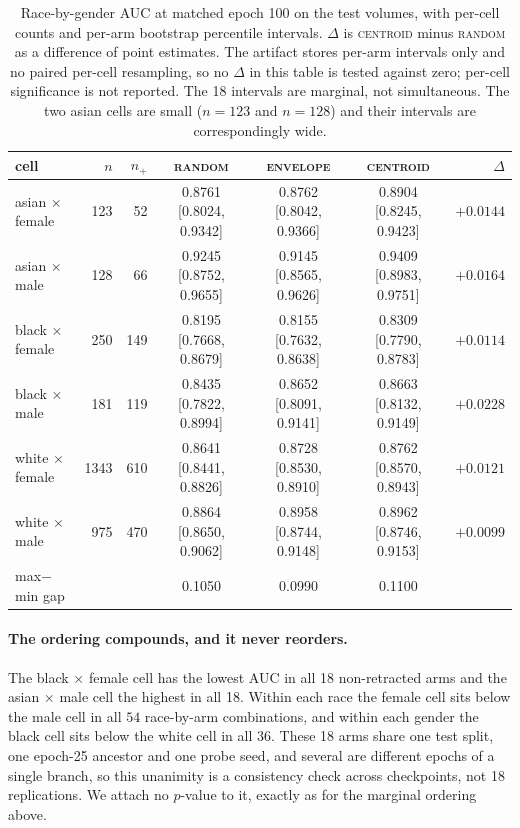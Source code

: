 \documentclass{article}
\newcommand{\ArmBest}{\textsc{centroid}}
\begin{document}
\begin{table}[h]
\centering
\caption{Race-by-gender AUC at matched epoch 100 on the \Ntest{} test volumes, with
per-cell counts and per-arm bootstrap percentile intervals. $\Delta$ is
\ArmBest{} minus \textsc{random} as a difference of point estimates. The
artifact stores per-arm intervals only and no paired per-cell resampling, so no
$\Delta$ in this table is tested against zero; per-cell significance is not reported.
The 18 intervals are marginal, not simultaneous.
The two asian cells are small ($n{=}123$ and $n{=}128$) and their intervals are
correspondingly wide.}
\label{tab:intersectional}
\scriptsize
\setlength{\tabcolsep}{3.5pt}
\begin{tabular}{lrrcccr}
\toprule
cell & $n$ & $n_{+}$ & \textsc{random} & \textsc{envelope} & \ArmBest{} & $\Delta$ \\
\midrule
asian $\times$ female & 123  & 52  & 0.8761 [0.8024, 0.9342] & 0.8762 [0.8042, 0.9366] & 0.8904 [0.8245, 0.9423] & $+0.0144$ \\
asian $\times$ male   & 128  & 66  & 0.9245 [0.8752, 0.9655] & 0.9145 [0.8565, 0.9626] & 0.9409 [0.8983, 0.9751] & $+0.0164$ \\
black $\times$ female & 250  & 149 & 0.8195 [0.7668, 0.8679] & 0.8155 [0.7632, 0.8638] & 0.8309 [0.7790, 0.8783] & $+0.0114$ \\
black $\times$ male   & 181  & 119 & 0.8435 [0.7822, 0.8994] & 0.8652 [0.8091, 0.9141] & 0.8663 [0.8132, 0.9149] & $+0.0228$ \\
white $\times$ female & 1343 & 610 & 0.8641 [0.8441, 0.8826] & 0.8728 [0.8530, 0.8910] & 0.8762 [0.8570, 0.8943] & $+0.0121$ \\
white $\times$ male   & 975  & 470 & 0.8864 [0.8650, 0.9062] & 0.8958 [0.8744, 0.9148] & 0.8962 [0.8746, 0.9153] & $+0.0099$ \\
\midrule
max$-$min gap         &      &     & 0.1050 & 0.0990 & 0.1100 & \\
\bottomrule
\end{tabular}
\end{table}

\paragraph{The ordering compounds, and it never reorders.} The black
$\times$ female cell has the lowest AUC in all 18 non-retracted arms and the
asian $\times$ male cell the highest in all 18. Within each race the female cell
sits below the male cell in all $54$ race-by-arm combinations, and within each
gender the black cell sits below the white cell in all $36$. These 18 arms share one
test split, one epoch-25 ancestor and one probe seed, and several are different
epochs of a single branch, so this unanimity is a consistency check across
checkpoints, not 18 replications. We attach no $p$-value to it, exactly as for
the marginal ordering above.
\end{document}
